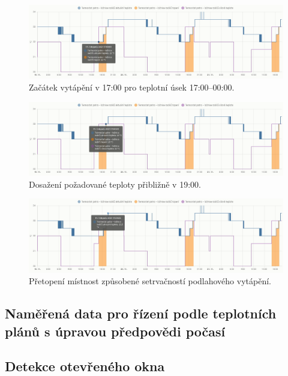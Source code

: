 \begin{figure}[H]
    \centering
    \includegraphics[width=\textwidth]{images/testovani/teplotni-plany/loznice-rodicu-termostat-zacatek-vytapeni.png}
    \caption{Začátek vytápění v 17:00 pro teplotní úsek 17:00–00:00.}
    \label{fig:loznice-rodicu-termostat-zacatek-vytapeni}
\end{figure}

\begin{figure}[H]
    \centering
    \includegraphics[width=\textwidth]{images/testovani/teplotni-plany/loznice-rodicu-termostat-konec-vytepeni.png}
    \caption{Dosažení požadované teploty přibližně v 19:00.}
    \label{fig:loznice-rodicu-termostat-konec-vytepeni}
\end{figure}

\begin{figure}[H]
    \centering
    \includegraphics[width=\textwidth]{images/testovani/teplotni-plany/loznice-rodicu-termostat-presazeni-teploty.png}
    \caption{Přetopení místnost způsobené setrvačností podlahového vytápění.}
    \label{fig:loznice-rodicu-termostat-presazeni-teploty}
\end{figure}

\subsection{Naměřená data pro řízení podle teplotních plánů s úpravou předpovědi počasí}

\subsection{Detekce otevřeného okna}